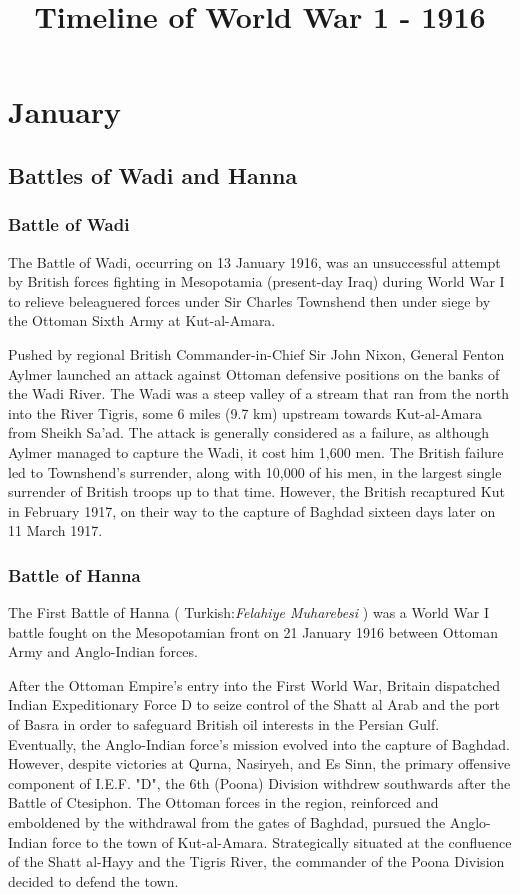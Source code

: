 \documentclass[a4paper,]{book}
\begin{document}
\title{Timeline of World War 1 - 1916}
\maketitle
\tableofcontents

\chapter{January}

\section{Battles of Wadi and Hanna}

\subsection{Battle of Wadi}

The Battle of Wadi, occurring on 13 January 1916, was an unsuccessful attempt by British forces fighting in Mesopotamia (present-day Iraq) during World War I to relieve beleaguered forces under Sir Charles Townshend then under siege by the Ottoman Sixth Army at Kut-al-Amara.

Pushed by regional British Commander-in-Chief Sir John Nixon, General Fenton Aylmer launched an attack against Ottoman defensive positions on the banks of the Wadi River. The Wadi was a steep valley of a stream that ran from the north into the River Tigris, some 6 miles (9.7 km) upstream towards Kut-al-Amara from Sheikh Sa'ad. The attack is generally considered as a failure, as although Aylmer managed to capture the Wadi, it cost him 1,600 men. The British failure led to Townshend's surrender, along with 10,000 of his men, in the largest single surrender of British troops up to that time. However, the British recaptured Kut in February 1917, on their way to the capture of Baghdad sixteen days later on 11 March 1917. 

\subsection{Battle of Hanna}

The First Battle of Hanna ( Turkish:\textit{Felahiye Muharebesi} ) was a World War I battle fought on the Mesopotamian front on 21 January 1916 between Ottoman Army and Anglo-Indian forces. 

After the Ottoman Empire's entry into the First World War, Britain dispatched Indian Expeditionary Force D to seize control of the Shatt al Arab and the port of Basra in order to safeguard British oil interests in the Persian Gulf. Eventually, the Anglo-Indian force's mission evolved into the capture of Baghdad. However, despite victories at Qurna, Nasiryeh, and Es Sinn, the primary offensive component of I.E.F. "D", the 6th (Poona) Division withdrew southwards after the Battle of Ctesiphon. The Ottoman forces in the region, reinforced and emboldened by the withdrawal from the gates of Baghdad, pursued the Anglo-Indian force to the town of Kut-al-Amara. Strategically situated at the confluence of the Shatt al-Hayy and the Tigris River, the commander of the Poona Division decided to defend the town.
\end{document}
